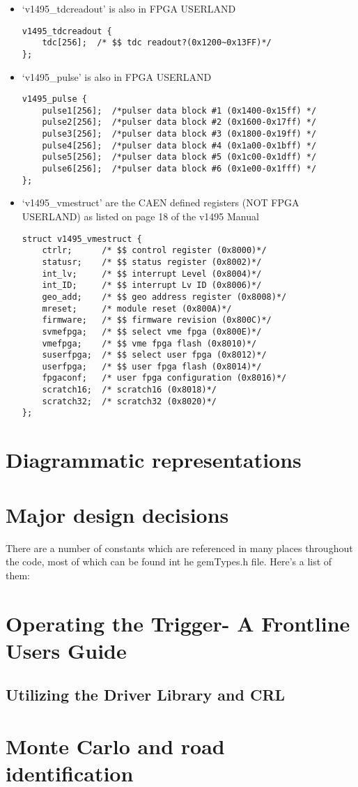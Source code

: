 \documentclass[11pt]{article}
\begin{document}
\begin{itemize}
		\item `v1495\_tdcreadout' is also in FPGA USERLAND
			\begin{lstlisting}
v1495_tdcreadout {
    tdc[256];  /* $$ tdc readout?(0x1200~0x13FF)*/
};			
			\end{lstlisting}
		\item `v1495\_pulse' is also in FPGA USERLAND
			\begin{lstlisting}
v1495_pulse {
    pulse1[256];  /*pulser data block #1 (0x1400-0x15ff) */
    pulse2[256];  /*pulser data block #2 (0x1600-0x17ff) */
    pulse3[256];  /*pulser data block #3 (0x1800-0x19ff) */
    pulse4[256];  /*pulser data block #4 (0x1a00-0x1bff) */
    pulse5[256];  /*pulser data block #5 (0x1c00-0x1dff) */
    pulse6[256];  /*pulser data block #6 (0x1e00-0x1fff) */
};
			\end{lstlisting}
		\item `v1495\_vmestruct' are the CAEN defined registers (NOT FPGA USERLAND) as listed on page 18 of the v1495 Manual
			\begin{lstlisting}
struct v1495_vmestruct {
    ctrlr;      /* $$ control register (0x8000)*/
    statusr;    /* $$ status register (0x8002)*/
    int_lv;     /* $$ interrupt Level (0x8004)*/
    int_ID;     /* $$ interrupt Lv ID (0x8006)*/
    geo_add;    /* $$ geo address register (0x8008)*/
    mreset;     /* module reset (0x800A)*/
    firmware;   /* $$ firmware revision (0x800C)*/
    svmefpga;   /* $$ select vme fpga (0x800E)*/
    vmefpga;    /* $$ vme fpga flash (0x8010)*/ 
    suserfpga;  /* $$ select user fpga (0x8012)*/
    userfpga;   /* $$ user fpga flash (0x8014)*/
    fpgaconf;   /* user fpga configuration (0x8016)*/
    scratch16;  /* scratch16 (0x8018)*/
    scratch32;  /* scratch32 (0x8020)*/                                                                                                                                                                           
};			
			\end{lstlisting}
		\end{itemize}
		

\section{Diagrammatic representations}
	

\section{Major design decisions}
There are a number of constants which are referenced in many places throughout the code, most of which can be found int he gemTypes.h file. Here's a list of them:


\section{Operating the Trigger- A Frontline Users Guide}
	\subsection{Utilizing the Driver Library and CRL} 

\section{Monte Carlo and road identification}
\end{document}
